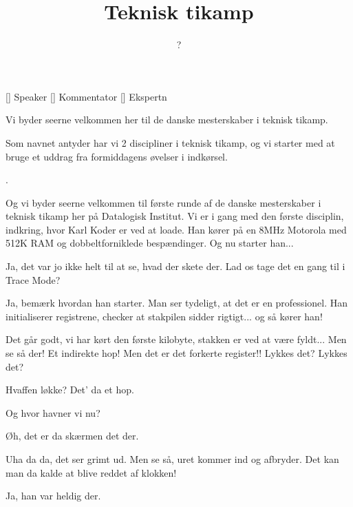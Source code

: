 \documentclass[a4paper,11pt]{article}
\title{Teknisk tikamp}
\author{?}
\begin{document}
\maketitle

\begin{roles}
  [] Speaker
  [] Kommentator
  [] Ekspertn
\end{roles}


\begin{sketch}


   Vi byder seerne velkommen her til de danske mesterskaber i
  teknisk tikamp.

   Som navnet antyder har vi 2 discipliner i teknisk tikamp,
  og vi starter med at bruge et uddrag fra formiddagens øvelser i
  indkørsel.

  .

   Og vi byder seerne velkommen til første runde af de danske
  mesterskaber i teknisk tikamp her på Datalogisk Institut.  Vi er i
  gang med den første disciplin, indkring, hvor Karl Koder er ved at
  loade.  Han kører på en 8MHz Motorola med 512K RAM og
  dobbeltforniklede bespændinger.  Og nu starter han...


   Ja, det var jo ikke helt til at se, hvad der skete der.
  Lad os tage det en gang til i Trace Mode?

   Ja, bemærk hvordan han starter.  Man ser tydeligt, at det
  er en professionel.  Han initialiserer registrene, checker at
  stakpilen sidder rigtigt... og så kører han!

   Det går godt, vi har kørt den første kilobyte, stakken er
  ved at være fyldt... Men se så der!  Et indirekte hop!  Men det er
  det forkerte register!!  Lykkes det?  Lykkes det?

   Hvaffen løkke?  Det' da et hop.

   Og hvor havner vi nu?

   Øh, det er da skærmen det der.

   Uha da da, det ser grimt ud.  Men se så, uret kommer ind og
  afbryder.  Det kan man da kalde at blive reddet af klokken!

   Ja, han var heldig der.


\end{sketch}
\end{document}
